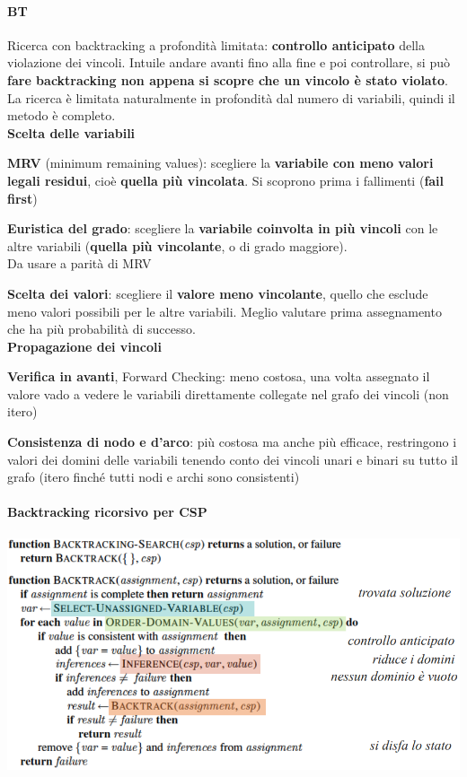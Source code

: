 \documentclass[10pt]{book}
\begin{document}
\paragraph{BT} Ricerca con backtracking a profondità limitata: \textbf{controllo anticipato} della violazione dei vincoli. Intuile andare avanti fino alla fine e poi controllare, si può \textbf{fare backtracking non appena si scopre che un vincolo è stato violato}.\\
La ricerca è limitata naturalmente in profondità dal numero di variabili, quindi il metodo è completo.\\
\textbf{Scelta delle variabili} 
\begin{list}{}{}
	\item\textbf{MRV} (minimum remaining values): scegliere la \textbf{variabile con meno valori legali residui}, cioè \textbf{quella più vincolata}. Si scoprono prima i fallimenti (\textbf{fail first})
	\item\textbf{Euristica del grado}: scegliere la \textbf{variabile coinvolta in più vincoli} con le altre variabili (\textbf{quella più vincolante}, o di grado maggiore).\\
	Da usare a parità di MRV
\end{list}
\textbf{Scelta dei valori}: scegliere il \textbf{valore meno vincolante}, quello che esclude meno valori possibili per le altre variabili. Meglio valutare prima assegnamento che ha più probabilità di successo.\\
\textbf{Propagazione dei vincoli}
\begin{list}{}{}
	\item \textbf{Verifica in avanti}, Forward Checking: meno costosa, una volta assegnato il valore vado a vedere le variabili direttamente collegate nel grafo dei vincoli (non itero)
	\item \textbf{Consistenza di nodo e d'arco}: più costosa ma anche più efficace, restringono i valori dei domini delle variabili tenendo conto dei vincoli unari e binari su tutto il grafo (itero finché tutti nodi e archi sono consistenti)
\end{list}
\paragraph{Backtracking ricorsivo per CSP}
\begin{center}
	\includegraphics[scale=0.7]{cspbtricorsivo.png}
\end{center}
\end{document}
